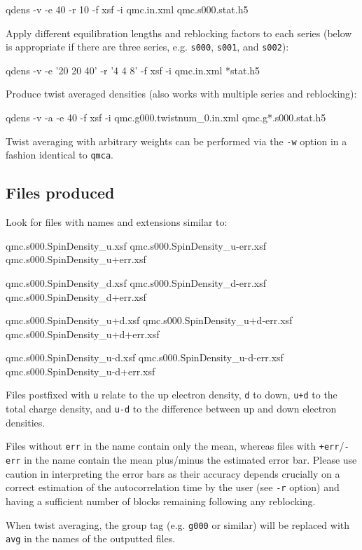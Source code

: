 \begin{shade}
  qdens -v -e 40 -r 10 -f xsf -i qmc.in.xml qmc.s000.stat.h5
\end{shade}

Apply different equilibration lengths and reblocking factors to each series 
(below is appropriate if there are three series, e.g. \texttt{s000}, \texttt{s001}, and \texttt{s002}):

\begin{shade}
  qdens -v -e '20 20 40' -r '4 4 8' -f xsf -i qmc.in.xml *stat.h5
\end{shade}

Produce twist averaged densities (also works with multiple series and reblocking):

\begin{shade}
  qdens -v -a -e 40 -f xsf -i qmc.g000.twistnum_0.in.xml qmc.g*.s000.stat.h5
\end{shade}

Twist averaging with arbitrary weights can be performed via the \texttt{-w} option in a fashion identical to \texttt{qmca}.


\subsection{Files produced}

Look for files with names and extensions similar to:

\begin{shade}
  qmc.s000.SpinDensity_u.xsf      
  qmc.s000.SpinDensity_u-err.xsf  
  qmc.s000.SpinDensity_u+err.xsf  

  qmc.s000.SpinDensity_d.xsf        
  qmc.s000.SpinDensity_d-err.xsf    
  qmc.s000.SpinDensity_d+err.xsf    

  qmc.s000.SpinDensity_u+d.xsf    
  qmc.s000.SpinDensity_u+d-err.xsf  
  qmc.s000.SpinDensity_u+d+err.xsf

  qmc.s000.SpinDensity_u-d.xsf    
  qmc.s000.SpinDensity_u-d-err.xsf  
  qmc.s000.SpinDensity_u-d+err.xsf  
\end{shade}

Files postfixed with \texttt{u} relate to the up electron density, \texttt{d} to down, \texttt{u+d} to the total charge density, and \texttt{u-d} to the difference between up and down electron densities.

Files without \texttt{err} in the name contain only the mean, whereas files with \texttt{+err}/\texttt{-err} in the name contain the mean plus/minus the estimated error bar.  Please use caution in interpreting the error bars as their accuracy depends crucially on a correct estimation of the autocorrelation time by the user (see \texttt{-r} option) and having a sufficient number of blocks remaining following any reblocking.

When twist averaging, the group tag (e.g. \texttt{g000} or similar) will be replaced with \texttt{avg} in the names of the outputted files.
